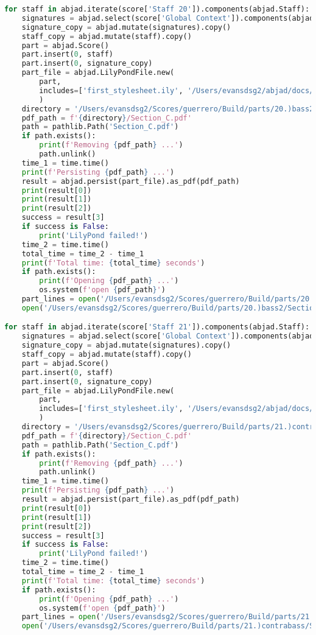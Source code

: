 \begin{lstlisting}[language=Python, caption=Invocation Source Code]
for staff in abjad.iterate(score['Staff 20']).components(abjad.Staff):
    signatures = abjad.select(score['Global Context']).components(abjad.Staff)
    signature_copy = abjad.mutate(signatures).copy()
    staff_copy = abjad.mutate(staff).copy()
    part = abjad.Score()
    part.insert(0, staff)
    part.insert(0, signature_copy)
    part_file = abjad.LilyPondFile.new(
        part,
        includes=['first_stylesheet.ily', '/Users/evansdsg2/abjad/docs/source/_stylesheets/abjad.ily'],
        )
    directory = '/Users/evansdsg2/Scores/guerrero/Build/parts/20.)bass2'
    pdf_path = f'{directory}/Section_C.pdf'
    path = pathlib.Path('Section_C.pdf')
    if path.exists():
        print(f'Removing {pdf_path} ...')
        path.unlink()
    time_1 = time.time()
    print(f'Persisting {pdf_path} ...')
    result = abjad.persist(part_file).as_pdf(pdf_path)
    print(result[0])
    print(result[1])
    print(result[2])
    success = result[3]
    if success is False:
        print('LilyPond failed!')
    time_2 = time.time()
    total_time = time_2 - time_1
    print(f'Total time: {total_time} seconds')
    if path.exists():
        print(f'Opening {pdf_path} ...')
        os.system(f'open {pdf_path}')
    part_lines = open('/Users/evansdsg2/Scores/guerrero/Build/parts/20.)bass2/Section_C.ly').readlines()
    open('/Users/evansdsg2/Scores/guerrero/Build/parts/20.)bass2/Section_C.ly', 'w').writelines(part_lines[15:-1])

for staff in abjad.iterate(score['Staff 21']).components(abjad.Staff):
    signatures = abjad.select(score['Global Context']).components(abjad.Staff)
    signature_copy = abjad.mutate(signatures).copy()
    staff_copy = abjad.mutate(staff).copy()
    part = abjad.Score()
    part.insert(0, staff)
    part.insert(0, signature_copy)
    part_file = abjad.LilyPondFile.new(
        part,
        includes=['first_stylesheet.ily', '/Users/evansdsg2/abjad/docs/source/_stylesheets/abjad.ily'],
        )
    directory = '/Users/evansdsg2/Scores/guerrero/Build/parts/21.)contrabass'
    pdf_path = f'{directory}/Section_C.pdf'
    path = pathlib.Path('Section_C.pdf')
    if path.exists():
        print(f'Removing {pdf_path} ...')
        path.unlink()
    time_1 = time.time()
    print(f'Persisting {pdf_path} ...')
    result = abjad.persist(part_file).as_pdf(pdf_path)
    print(result[0])
    print(result[1])
    print(result[2])
    success = result[3]
    if success is False:
        print('LilyPond failed!')
    time_2 = time.time()
    total_time = time_2 - time_1
    print(f'Total time: {total_time} seconds')
    if path.exists():
        print(f'Opening {pdf_path} ...')
        os.system(f'open {pdf_path}')
    part_lines = open('/Users/evansdsg2/Scores/guerrero/Build/parts/21.)contrabass/Section_C.ly').readlines()
    open('/Users/evansdsg2/Scores/guerrero/Build/parts/21.)contrabass/Section_C.ly', 'w').writelines(part_lines[15:-1])
\end{lstlisting}
